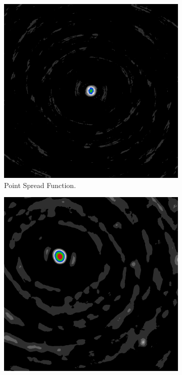 \begin{figure}[h]
	\centering
	\begin{subfigure}[b]{0.3\linewidth}
		\includegraphics[width=\linewidth]{./chapters/01.intro/mk2/psf.png}
		\caption{Point Spread Function.}
		\label{results:points:tclean}
	\end{subfigure}
	\begin{subfigure}[b]{0.3\linewidth}
		\includegraphics[width=\linewidth]{./chapters/01.intro/mk2/dirty.png}

\end{subfigure}
\end{figure}
